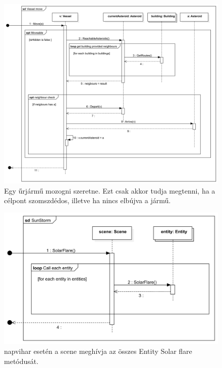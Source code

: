 \begin{figure}[H] 
\centering 
\includegraphics[width=1\textwidth]{docs/3_Project/svg/Design Model!Vessel Actions!Vessel move!Vessel move_15.png} 
\caption{Egy űrjármű mozogni szeretne. Ezt csak akkor tudja megtenni, ha a célpont szomszdédos, illetve ha nincs elbújva a jármű.} 
\end{figure} 

\begin{figure}[H] 
\centering 
\includegraphics[width=1\textwidth]{docs/3_Project/svg/Design Model!Sun storm!Sun Storm!SunStorm_16.png} 
\caption{napvihar esetén a scene meghívja az összes Entity Solar flare metódusát.} 
\end{figure} 

